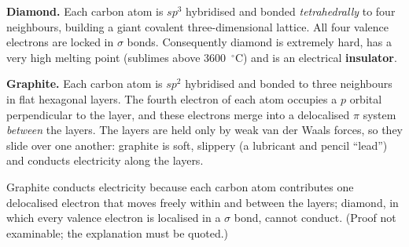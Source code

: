 \documentclass[11pt]{article}
\newcommand{\cle}[1]{{\popxbold\color{popdark}#1}}
\begin{document}
\textbf{Diamond.} Each carbon atom is $sp^3$ hybridised and bonded \emph{tetrahedrally} to four neighbours, building a \cle{giant covalent} three-dimensional lattice. All four valence electrons are locked in $\sigma$ bonds. Consequently diamond is extremely hard, has a very high melting point (sublimes above \SI{3600}{\ensuremath{{}^{\circ}\mathrm{C}}}) and is an electrical \textbf{insulator}.

\textbf{Graphite.} Each carbon atom is $sp^2$ hybridised and bonded to three neighbours in flat hexagonal layers. The fourth electron of each atom occupies a $p$ orbital perpendicular to the layer, and these electrons merge into a \cle{delocalised} $\pi$ system \emph{between} the layers. The layers are held only by weak van der Waals forces, so they slide over one another: graphite is soft, slippery (a lubricant and pencil ``lead'') and conducts electricity along the layers.

\begin{propriete}
Graphite conducts electricity because each carbon atom contributes one \cle{delocalised electron} that moves freely within and between the layers; diamond, in which every valence electron is localised in a $\sigma$ bond, cannot conduct. (Proof not examinable; the explanation must be quoted.)
\end{propriete}
\end{document}
